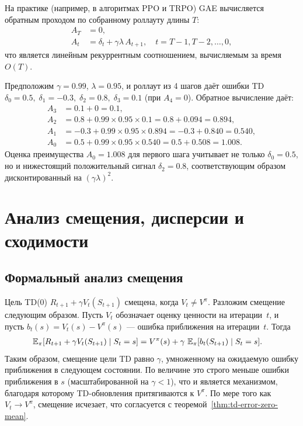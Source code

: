 На практике (например, в алгоритмах PPO и TRPO) GAE вычисляется обратным проходом по собранному роллауту длины $T$:
\begin{align*}
A_T &= 0,\\
A_t &= \delta_t + \gamma\lambda\,A_{t+1}, \quad t = T-1, T-2, \ldots, 0,
\end{align*}
что является линейным рекуррентным соотношением, вычисляемым за время $O(T)$.

\begin{example}
Предположим $\gamma=0.99$, $\lambda=0.95$, и роллаут из 4 шагов даёт ошибки TD $\delta_0=0.5,\;\delta_1=-0.3,\;\delta_2=0.8,\;\delta_3=0.1$ (при $A_4=0$).  Обратное вычисление даёт:
\begin{align*}
A_3 &= 0.1 + 0 = 0.1,\\
A_2 &= 0.8 + 0.99\times 0.95\times 0.1 = 0.8 + 0.094 = 0.894,\\
A_1 &= -0.3 + 0.99\times 0.95\times 0.894 = -0.3 + 0.840 = 0.540,\\
A_0 &= 0.5 + 0.99\times 0.95\times 0.540 = 0.5 + 0.508 = 1.008.
\end{align*}
Оценка преимущества $A_0 = 1.008$ для первого шага учитывает не только $\delta_0 = 0.5$, но и нижестоящий положительный сигнал $\delta_2 = 0.8$, соответствующим образом дисконтированный на $({\gamma\lambda})^2$.
\end{example}

\section{Анализ смещения, дисперсии и сходимости}
\label{sec:td-bias-variance}

\subsection{Формальный анализ смещения}

Цель TD(0) $R_{t+1}+\gamma V_t(S_{t+1})$ смещена, когда $V_t \ne V^\pi$.  Разложим смещение следующим образом.  Пусть $V_t$ обозначает оценку ценности на итерации~$t$, и пусть $b_t(s) = V_t(s) - V^\pi(s)$ --- ошибка приближения на итерации~$t$.  Тогда
\begin{align*}
\operatorname{\mathbb{E}}_\pi[R_{t+1}+\gamma V_t(S_{t+1})\mid S_t=s]
&= V^\pi(s) + \gamma\,\operatorname{\mathbb{E}}_\pi[b_t(S_{t+1})\mid S_t=s].
\end{align*}
Таким образом, смещение цели TD равно $\gamma$, умноженному на ожидаемую ошибку приближения в следующем состоянии.  По величине это строго меньше ошибки приближения в $s$ (масштабированной на $\gamma < 1$), что и является механизмом, благодаря которому TD-обновления притягиваются к $V^\pi$.  По мере того как $V_t\to V^\pi$, смещение исчезает, что согласуется с теоремой~\ref{thm:td-error-zero-mean}.

